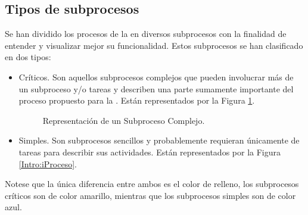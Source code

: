 \subsection{Tipos de subprocesos}


Se han dividido los procesos de la  en diversos subprocesos con la finalidad de entender y visualizar mejor su funcionalidad. Estos subprocesos se han clasificado en dos tipos:
\begin{itemize}
	\item Críticos. Son aquellos subprocesos complejos que pueden involucrar más de un subproceso y/o tareas y describen una parte sumamente importante del proceso propuesto para la . Están representados por la Figura \ref{Intro:iProcesoComplejo}.
	\begin{figure}[!h]
	\centering{}%
	\caption{Representación de un Subproceso Complejo.}
	\label{Intro:iProcesoComplejo}
	\end{figure}

	\item Simples. Son subprocesos sencillos y probablemente requieran únicamente de tareas para describir sus actividades. Están representados por la Figura \ref{Intro:iProceso}.
\end{itemize}

\noindent Notese que la única diferencia entre ambos es el color de relleno, los subprocesos críticos son de color amarillo, mientras que los subprocesos simples son de color azul.\\



